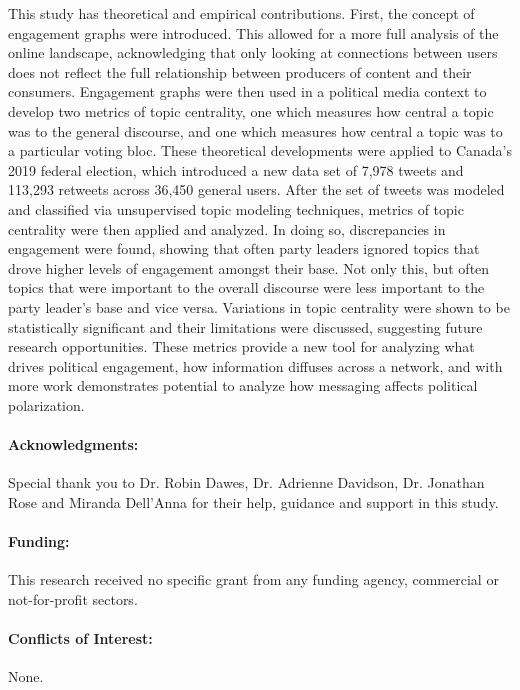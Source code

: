 This study has theoretical and empirical contributions. First, the concept of
engagement graphs were introduced. This allowed for a more full analysis of the
online landscape, acknowledging that only looking at connections between users
does not reflect the full relationship between producers of content and their
consumers. Engagement graphs were then used in a political media context to
develop two metrics of topic centrality, one which measures how central a topic
was to the general discourse, and one which measures how central a topic was to
a particular voting bloc. These theoretical developments were applied to
Canada's 2019 federal election, which introduced a new data set of 7,978 tweets
and 113,293 retweets across 36,450 general users. After the set of tweets was
modeled and classified via unsupervised topic modeling techniques, metrics
of topic centrality were then applied and analyzed. In doing so, discrepancies
in engagement were found, showing that often party leaders ignored topics that
drove higher levels of engagement amongst their base. Not only this, but often
topics that were important to the overall discourse were less important to the
party leader's base and vice versa. Variations in topic centrality were shown to
be statistically significant and their limitations were discussed, suggesting
future research opportunities. These metrics provide a new tool for analyzing
what drives political engagement, how information diffuses across a network, and
with more work demonstrates potential to analyze how messaging affects political
polarization.

\paragraph{Acknowledgments:} Special thank you to Dr. Robin Dawes, Dr. Adrienne
Davidson, Dr. Jonathan Rose and Miranda Dell'Anna for their help, guidance and
support in this study. 

\paragraph{Funding:} This research received no specific grant from any funding
agency, commercial or not-for-profit sectors.

\paragraph{Conflicts of Interest:} None.

\pagebreak




\label{lastpage}




